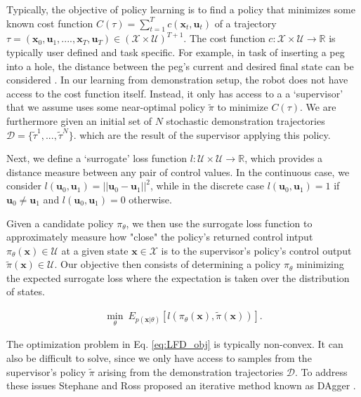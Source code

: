 \documentclass[10pt, conference]{ieeeconf}      %
\newcommand{\bu}{\mathbf{u}}
\newcommand{\bx}{\mathbf{x}}
\begin{document}
Typically, the objective of policy learning is to find a policy that minimizes some known cost function
$C(\tau) = \sum^T_{t=1} c(\bx_t,\bu_t)$ of a trajectory $\tau = (\mathbf{x}_0,\mathbf{u}_1, ...., \mathbf{x}_T,\mathbf{u}_T)\in (\mathcal{X}\times
\mathcal{U})^{T+1}$. The cost function $c:\mathcal{X}\times \mathcal{U}\to \mathbb{R}$ is typically user defined and task specific. 
For example, in task of inserting a peg into a hole, the distance between the peg's current and desired final state can
be considered \cite{levine2015end}.  
In our learning from demonstration setup, the robot does not have access to the cost function itself. Instead, it only has access to a
a `supervisor' that we assume uses some near-optimal policy $\tilde{\pi}$ to minimize $C(\tau)$. We are furthermore given
an initial set of $N$ stochastic demonstration trajectories $\mathcal{D} = \lbrace \tilde{\tau}^1,...,\tilde{\tau}^N \rbrace$. 
which are the result of the supervisor applying this policy. 

Next, we define a `surrogate' loss function $l:\mathcal{U}\times \mathcal{U}\to \mathbb{R}$, which provides a distance
measure between any pair of control values. In the continuous case, we consider $l(\bu_0,\bu_1) = ||\bu_0-\bu_1||^2$,
while in the discrete case $l(\bu_0,\bu_1) = 1$ if $\bu_0 \neq \bu_1$ and $l(\bu_0, \bu_1)=0$ otherwise.

Given a candidate policy $\pi_{\theta}$, we then use the surrogate loss function to approximately measure how "close" the policy's
returned control intput $\pi_{\theta}(\bx)\in \mathcal{U}$ at a given state $\bx\in \mathcal{X}$ is to the supervisor's policy's control output
$\tilde{\pi}(\bx)\in \mathcal{U}$. Our objective then consists of determining a policy $\pi_{\theta}$ minimizing the expected surrogate loss where the expectation is taken over the distribution of states. 

 \vspace{-2ex}
\begin{align}\label{eq:LFD_obj}
\underset{\theta}{\min} \: E_{p(\bx|\theta)} [l(\pi_\theta(\bx),\tilde{\pi}(\bx))].
\end{align}
 
The optimization problem in Eq. \ref{eq:LFD_obj} is  typically non-convex. It can also be difficult to solve, since we only have access to samples from the supervisor's policy $\tilde{\pi}$ arising from the demonstration trajectories $\mathcal{D}$. To address these issues Stephane and Ross proposed an iterative method known as DAgger \cite{ross2010reduction}.
\end{document}
